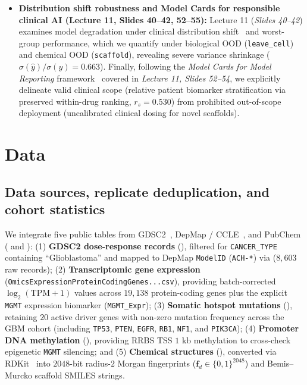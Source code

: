 \documentclass{article}
\begin{document}
\begin{itemize}
  \item \textbf{Distribution shift robustness and Model Cards for responsible clinical AI (Lecture 11, Slides 40--42, 52--55):} Lecture 11 (\emph{Slides 40--42}) examines model degradation under clinical distribution shift~\cite{nestor2019feature} and worst-group performance, which we quantify under biological OOD (\texttt{leave\_cell}) and chemical OOD (\texttt{scaffold}), revealing severe variance shrinkage ($\sigma(\hat{y})/\sigma(y) = 0.663$). Finally, following the \emph{Model Cards for Model Reporting} framework~\cite{mitchell2019model} covered in \emph{Lecture 11, Slides 52--54}, we explicitly delineate valid clinical scope (relative patient biomarker stratification via preserved within-drug ranking, $r_s = 0.530$) from prohibited out-of-scope deployment (uncalibrated clinical dosing for novel scaffolds).
\end{itemize}

\section{Data}
\label{sec:data}

\subsection{Data sources, replicate deduplication, and cohort statistics}
We integrate five public tables from GDSC2~\cite{yang2013gdsc,iorio2016landscape}, DepMap / CCLE~\cite{tsherniak2017depmap,ghandi2019next}, and PubChem ( and ):
(1) \textbf{GDSC2 dose-response records} (), filtered for \texttt{CANCER\_TYPE} containing ``Glioblastoma'' and mapped to DepMap \texttt{ModelID} (\texttt{ACH-*}) via  ($8,603$ raw records);
(2) \textbf{Transcriptomic gene expression} ({\small\texttt{OmicsExpressionProteinCodingGenes...csv}}), providing batch-corrected $\log_2(\text{TPM} + 1)$ values across $19,138$ protein-coding genes plus the explicit \texttt{MGMT} expression biomarker (\texttt{MGMT\_Expr});
(3) \textbf{Somatic hotspot mutations} (), retaining $20$ active driver genes with non-zero mutation frequency across the GBM cohort (including \texttt{TP53}, \texttt{PTEN}, \texttt{EGFR}, \texttt{RB1}, \texttt{NF1}, and \texttt{PIK3CA});
(4) \textbf{Promoter DNA methylation} (), providing RRBS TSS $1\text{ kb}$ methylation to cross-check epigenetic \texttt{MGMT} silencing; and
(5) \textbf{Chemical structures} (), converted via RDKit~\cite{landrum2016rdkit} into $2048$-bit radius-$2$ Morgan fingerprints ($\mathbf{f}_{d} \in \{0, 1\}^{2048}$) and Bemis--Murcko scaffold SMILES strings.
\end{document}
